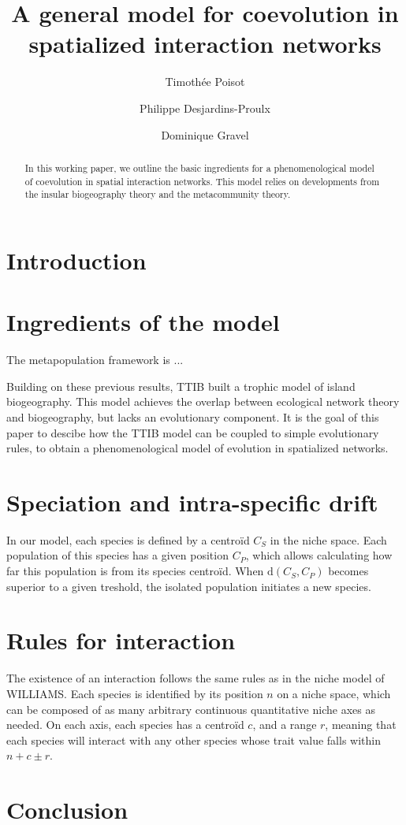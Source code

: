 \documentclass[12pt]{article}
\author{Timoth\'ee Poisot \and Philippe Desjardins-Proulx \and Dominique Gravel}
\title{A general model for coevolution in spatialized interaction networks}
\begin{document}
	
\maketitle\doublespacing

\begin{abstract}
	In this working paper, we outline the basic ingredients for a
	phenomenological model of coevolution in spatial interaction networks.
	This model relies on developments from the insular biogeography theory and
	the metacommunity theory.
\end{abstract}

\section{Introduction}

\section{Ingredients of the model}

The metapopulation framework is ...

Building on these previous results, TTIB built a trophic model of island
biogeography. This model achieves the overlap between ecological network
theory and biogeography, but lacks an evolutionary component. It is the goal
of this paper to descibe how the TTIB model can be coupled to simple
evolutionary rules, to obtain a phenomenological model of evolution in
spatialized networks.

\section{Speciation and intra-specific drift}

In our model, each species is defined by a centroïd $C_S$ in the niche space.
Each population of this species has a given position $C_P$, which allows
calculating how far this population is from its species centroïd. When
$\mathrm{d}(C_S,C_P)$ becomes superior to a given treshold, the isolated
population initiates a new species.

\section{Rules for interaction}

The existence of an interaction follows the same rules as in the niche model
of WILLIAMS. Each species is identified by its position $n$ on a niche space,
which can be composed of as many arbitrary continuous quantitative niche axes
as needed. On each axis, each species has a centroïd $c$, and a range $r$,
meaning that each species will interact with any other species whose trait
value falls within $n+c\pm r$.

\section{Conclusion}

\printbibliography
\end{document}
